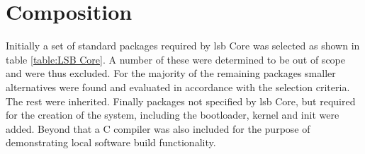 \section{Composition}\label{Composition}

Initially a set of standard packages required by \gls{lsb} Core was selected as shown in table \ref{table:LSB Core}. A number of these were determined to be out of scope and were thus excluded. For the majority of the remaining packages smaller alternatives were found and evaluated in accordance with the selection criteria. The rest were inherited. Finally packages not specified by \gls{lsb} Core, but required for the creation of the system, including the bootloader, kernel and init were added. Beyond that a C compiler was also included for the purpose of demonstrating local software build functionality.

\newpage

\newpage

\newpage


